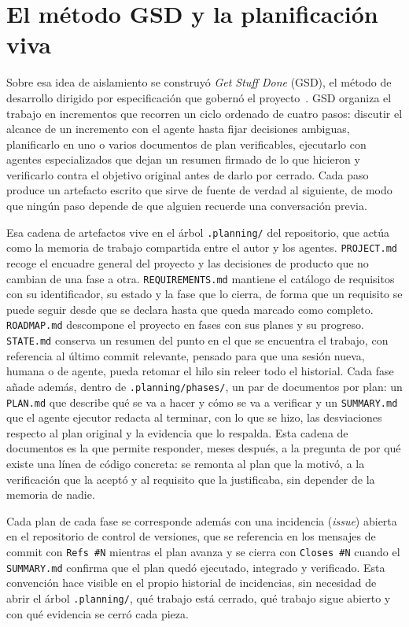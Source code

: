 \section{El método GSD y la planificación viva}\label{sec:gestion-gsd}

Sobre esa idea de aislamiento se construyó \textit{Get Stuff Done} (GSD), el método de
desarrollo dirigido por especificación que gobernó el proyecto~\cite{gsd}. GSD organiza el
trabajo en incrementos que recorren un ciclo ordenado de cuatro pasos: discutir el alcance de
un incremento con el agente hasta fijar decisiones ambiguas, planificarlo en uno o varios
documentos de plan verificables, ejecutarlo con agentes especializados que dejan un resumen
firmado de lo que hicieron y verificarlo contra el objetivo original antes de darlo por
cerrado. Cada paso produce un artefacto escrito que sirve de fuente de verdad al siguiente, de
modo que ningún paso depende de que alguien recuerde una conversación previa.

Esa cadena de artefactos vive en el árbol \texttt{.planning/} del repositorio, que actúa como
la memoria de trabajo compartida entre el autor y los agentes. \texttt{PROJECT.md} recoge el
encuadre general del proyecto y las decisiones de producto que no cambian de una fase a otra.
\texttt{REQUIREMENTS.md} mantiene el catálogo de requisitos con su identificador, su estado y
la fase que lo cierra, de forma que un requisito se puede seguir desde que se declara hasta que
queda marcado como completo. \texttt{ROADMAP.md} descompone el proyecto en fases con sus planes
y su progreso. \texttt{STATE.md} conserva un resumen del punto en el que se encuentra el
trabajo, con referencia al último commit relevante, pensado para que una sesión nueva, humana o
de agente, pueda retomar el hilo sin releer todo el historial. Cada fase añade además, dentro de
\texttt{.planning/phases/}, un par de documentos por plan: un \texttt{PLAN.md} que describe qué
se va a hacer y cómo se va a verificar y un \texttt{SUMMARY.md} que el agente ejecutor redacta
al terminar, con lo que se hizo, las desviaciones respecto al plan original y la evidencia que
lo respalda. Esta cadena de documentos es la que permite responder, meses después, a la
pregunta de por qué existe una línea de código concreta: se remonta al plan que la motivó, a la
verificación que la aceptó y al requisito que la justificaba, sin depender de la memoria de
nadie.

Cada plan de cada fase se corresponde además con una incidencia (\textit{issue}) abierta en el
repositorio de control de versiones, que se referencia en los mensajes de commit con
\texttt{Refs \#N} mientras el plan avanza y se cierra con \texttt{Closes \#N} cuando el
\texttt{SUMMARY.md} confirma que el plan quedó ejecutado, integrado y verificado. Esta
convención hace visible en el propio historial de incidencias, sin necesidad de abrir el árbol
\texttt{.planning/}, qué trabajo está cerrado, qué trabajo sigue abierto y con qué evidencia se
cerró cada pieza.

